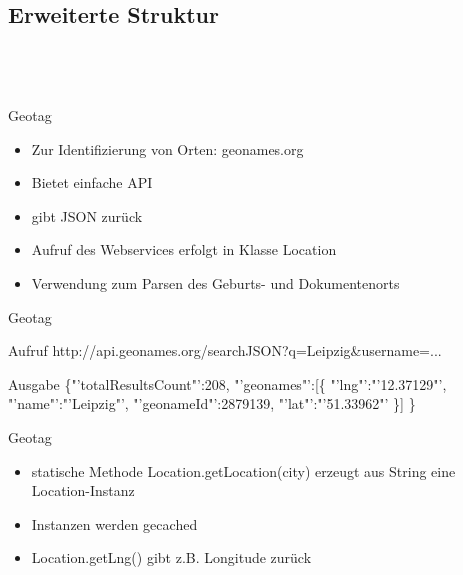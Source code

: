 \documentclass[12pt]{beamer}
\begin{document}
\begin{large}
\section{Erweiterte Struktur}
 \subsection*{~}

\begin{frame}{Geotag}
\begin{itemize}
  \item Zur Identifizierung von Orten: geonames.org
  \item Bietet einfache API
  \item gibt JSON zurück
  \item Aufruf des Webservices erfolgt in Klasse Location
  \item Verwendung zum Parsen des Geburts- und Dokumentenorts
 \end{itemize}
\end{frame}
 
\begin{frame}{Geotag}
 \vspace*{\fill}
 \begin{block}{Aufruf}
 \normalsize http://api.geonames.org/searchJSON?q=Leipzig\&username=...
 \end{block}
 
 \begin{block}{Ausgabe}
 \normalsize \{"'totalResultsCount"':208,
  \newline
  \hspace*{0.5cm}"'geonames"':[\{
  \newline
  \hspace*{1cm}"'lng"':"'12.37129"',
  \newline
  \hspace*{1cm}"'name"':"'Leipzig"',
  \newline  
  \hspace*{1cm}"'geonameId"':2879139,
  \newline
  \hspace*{1cm}"'lat"':"'51.33962"'
  \newline
  \hspace*{0.5cm}\}]
  \newline
  \}
 \end{block}
\end{frame} 
 
\begin{frame}{Geotag}
 \begin{itemize}
  \item statische Methode Location.getLocation(city) erzeugt aus String eine Location-Instanz
  \item Instanzen werden gecached
  \item Location.getLng() gibt z.B. Longitude zurück
 \end{itemize}
 

\end{frame}
\end{large}
\end{document}
